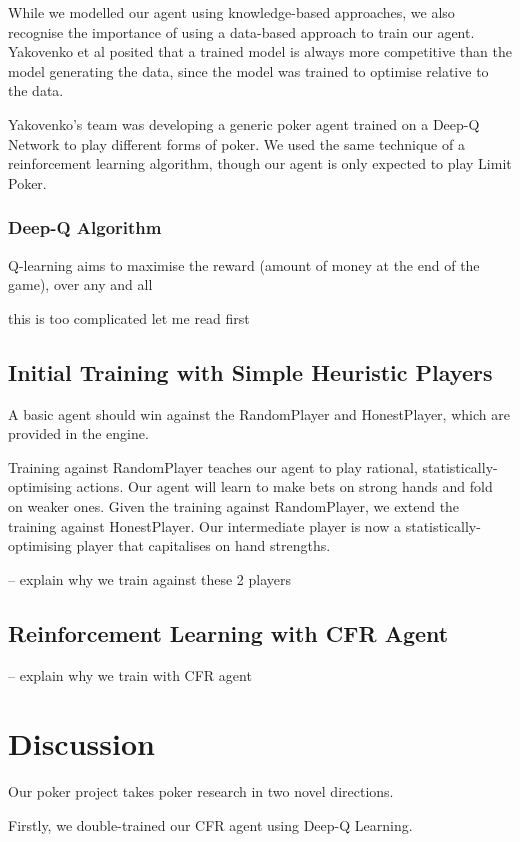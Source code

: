 \documentclass{article}
\begin{document}
While we modelled our agent using knowledge-based approaches, we also recognise the importance of using a data-based approach to train our agent. Yakovenko et al posited that a trained model is always more competitive than the model generating the data, since the model was trained to optimise relative to the data. 

Yakovenko's team was developing a generic poker agent trained on a Deep-Q Network to play different forms of poker. We used the same technique of a reinforcement learning algorithm, though our agent is only expected to play Limit Poker.

\subsubsection{Deep-Q Algorithm}
Q-learning aims to maximise the reward (amount of money at the end of the game), over any and all

this is too complicated let me read first


\subsection{Initial Training with Simple Heuristic Players}
A basic agent should win against the RandomPlayer and HonestPlayer, which are provided in the engine.

Training against RandomPlayer teaches our agent to play rational, statistically-optimising actions. Our agent will learn to make bets on strong hands and fold on weaker ones. Given the training against RandomPlayer, we extend the training against HonestPlayer. Our intermediate player is now a statistically-optimising player that capitalises on hand strengths.

-- explain why we train against these 2 players

\subsection{Reinforcement Learning with CFR Agent}

-- explain why we train with CFR agent

\section{Discussion}
Our poker project takes poker research in two novel directions.

Firstly, we double-trained our CFR agent using Deep-Q Learning.
\end{document}

